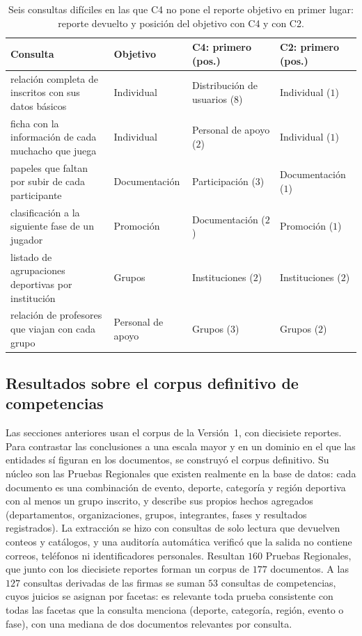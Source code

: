 \documentclass[11pt,letterpaper]{article}
\numberwithin{equation}{section}
\begin{document}
\begin{table}[htbp]
\centering
\footnotesize
\setlength{\tabcolsep}{4pt}
\renewcommand{\arraystretch}{1.2}
\caption{Seis consultas difíciles en las que C4 no pone el reporte objetivo en primer lugar: reporte devuelto y posición del objetivo con C4 y con C2.}
\label{tab:fallos}
\begin{tabularx}{\textwidth}{@{}Y l l l@{}}
\toprule
\textbf{Consulta} & \textbf{Objetivo} & \textbf{C4: primero (pos.)} & \textbf{C2: primero (pos.)} \\
\midrule
relación completa de inscritos con sus datos básicos & Individual & Distribución de usuarios ($8$) & Individual ($1$) \\
ficha con la información de cada muchacho que juega & Individual & Personal de apoyo ($2$) & Individual ($1$) \\
papeles que faltan por subir de cada participante & Documentación & Participación ($3$) & Documentación ($1$) \\
clasificación a la siguiente fase de un jugador & Promoción & Documentación ($2$) & Promoción ($1$) \\
listado de agrupaciones deportivas por institución & Grupos & Instituciones ($2$) & Instituciones ($2$) \\
relación de profesores que viajan con cada grupo & Personal de apoyo & Grupos ($3$) & Grupos ($2$) \\
\bottomrule
\end{tabularx}
\end{table}


\subsection{Resultados sobre el corpus definitivo de competencias}
\label{sec:res-final}
Las secciones anteriores usan el corpus de la Versión~1, con diecisiete reportes. Para contrastar las conclusiones a una escala mayor y en un dominio en el que las entidades sí figuran en los documentos, se construyó el corpus definitivo. Su núcleo son las Pruebas Regionales que existen realmente en la base de datos: cada documento es una combinación de evento, deporte, categoría y región deportiva con al menos un grupo inscrito, y describe sus propios hechos agregados (departamentos, organizaciones, grupos, integrantes, fases y resultados registrados). La extracción se hizo con consultas de solo lectura que devuelven conteos y catálogos, y una auditoría automática verificó que la salida no contiene correos, teléfonos ni identificadores personales. Resultan $160$ Pruebas Regionales, que junto con los diecisiete reportes forman un corpus de $177$ documentos. A las $127$ consultas derivadas de las firmas se suman $53$ consultas de competencias, cuyos juicios se asignan por facetas: es relevante toda prueba consistente con todas las facetas que la consulta menciona (deporte, categoría, región, evento o fase), con una mediana de dos documentos relevantes por consulta.
\end{document}

